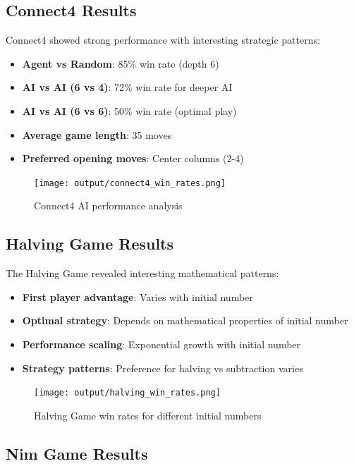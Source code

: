 \documentclass[12pt]{article}
\begin{document}
\subsection{Connect4 Results}

Connect4 showed strong performance with interesting strategic patterns:
\begin{itemize}
    \item \textbf{Agent vs Random}: 85\% win rate (depth 6)
    \item \textbf{AI vs AI (6 vs 4)}: 72\% win rate for deeper AI
    \item \textbf{AI vs AI (6 vs 6)}: 50\% win rate (optimal play)
    \item \textbf{Average game length}: 35 moves
    \item \textbf{Preferred opening moves}: Center columns (2-4)
\end{itemize}

\begin{figure}[H]
\centering
\texttt{[image: output/connect4\_win\_rates.png]}
\caption{Connect4 AI performance analysis}
\label{fig:connect4_win_rates}
\end{figure}

\subsection{Halving Game Results}

The Halving Game revealed interesting mathematical patterns:
\begin{itemize}
    \item \textbf{First player advantage}: Varies with initial number
    \item \textbf{Optimal strategy}: Depends on mathematical properties of initial number
    \item \textbf{Performance scaling}: Exponential growth with initial number
    \item \textbf{Strategy patterns}: Preference for halving vs subtraction varies
\end{itemize}

\begin{figure}[H]
\centering
\texttt{[image: output/halving\_win\_rates.png]}
\caption{Halving Game win rates for different initial numbers}
\label{fig:halving_win_rates}
\end{figure}

\subsection{Nim Game Results}
\end{document}
